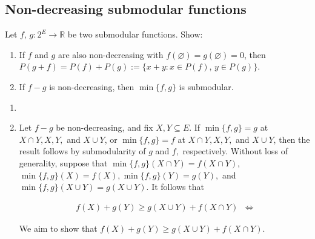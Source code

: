 \documentclass{article}
\let\emptyset\varnothing
\newcommand{\R}{\mathbb{R}}
\begin{document}
  \subsection{Non-decreasing submodular functions}
  \begin{centerframebox}
    Let $f,\, g : 2^E \to \R$ be two submodular functions. Show:

    \begin{enumerate}[label=(\roman*)]
      \item If $f$ and $g$ are also non-decreasing with $f(\emptyset) = g(\emptyset) = 0$,
      then $P(g+f) = P(f) + P(g) := \{x+y : x \in P(f),\, y \in P(g)\}$.
      \item If $f - g$ is non-decreasing, then $\min\{f,g\}$ is submodular.
    \end{enumerate}
  \end{centerframebox}
  \begin{enumerate}[label=(\roman*)]
      \item


      \item Let $f-g$ be non-decreasing, and fix $X,Y\subseteq E.$ If $\min\{f,g\}=g$ at $X\cap Y,X,Y,$ and $X\cup Y$, or $\min\{f,g\}=f$ at $X\cap Y,X,Y,$ and $X\cup Y$, then the result follows by submodularity of $g$ and $f,$ respectively. Without loss of generality, suppose that $\min\{f,g\}(X\cap Y)=f(X\cap Y)$, $\min\{f,g\}(X)=f(X),\min\{f,g\}(Y)=g(Y),$ and $\min\{f,g\}(X\cup Y)=g(X\cup Y).$ It follows that

      \begin{align*}
          f(X)+g(Y)\geq g(X\cup Y)+f(X\cap Y) & \iff
      \end{align*}

      We aim to show that $f(X)+g(Y)\geq g(X\cup Y)+f(X\cap Y).$
  \end{enumerate}
\end{document}
